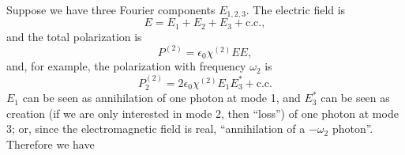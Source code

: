 \documentclass[hyperref, a4paper]{article}
\newcommand*{\ptwo}{P^{(2)}}
\newcommand*{\chitwo}{\chi^{(2)}}
\begin{document}
Suppose we have three Fourier components $E_{1, 2, 3}$.
The electric field is 
\begin{equation}
    E = E_1 + E_2 + E_3 + \text{c.c.},
\end{equation}
and the total polarization is 
\begin{equation}
    P^{(2)} = \epsilon_0 \chi^{(2)} E E ,
\end{equation}
and, for example, the polarization with frequency $\omega_2$ is 
\begin{equation}
    \ptwo_{2} = 2 \epsilon_0 \chitwo E_1 E_3^* + \text{c.c.}
\end{equation}
$E_1$ can be seen as annihilation of one photon at mode 1, 
and $E_3^*$ can be seen as creation 
(if we are only interested in mode 2, then ``loss'') 
of one photon at mode 3; 
or, since the electromagnetic field is real, 
``annihilation of a $- \omega_2$ photon''.
Therefore we have 
\end{document}
